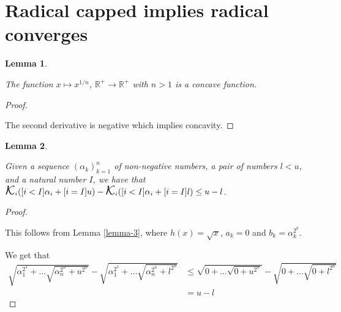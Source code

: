 \documentclass[
]{article}
\DeclareMathOperator*{\kap}{\text{\Large{$\mathcal K$}}}
\theoremstyle{theorem}
\theoremstyle{lemma}
\newtheorem{lemma}{Lemma}
\theoremstyle{corollary}
\theoremstyle{remark}
\theoremstyle{definition}
\begin{document}
\hypertarget{radical-capped-implies-radical-converges}{%
\section{Radical capped implies radical converges}\label{radical-capped-implies-radical-converges}}

\begin{lemma}
\hypertarget{lemma-4}{%
\label{lemma-4}}


The function \(x \mapsto x^{1/n}\), \(\mathbb R^+ \to \mathbb R^+\) with \(n > 1\) is a concave function.

\end{lemma}
\begin{proof}

\hypertarget{proof-4}{%
\label{proof-4}}
The second derivative is negative which implies concavity.

\end{proof}
\begin{lemma}
\hypertarget{lemma-5}{%
\label{lemma-5}}


Given a sequence \((\alpha_k)_{k=1}^n\) of non-negative numbers, a pair of numbers \(l < u\), and a natural number \(I\), we have that \(\kap_i([i < I]\alpha_i + [i = I]u) - \kap_i([i < I]\alpha_i + [i = I]l) \leq u - l\).

\end{lemma}
\begin{proof}

\hypertarget{proof-5}{%
\label{proof-5}}
This follows from Lemma \ref{lemma-3}, where \(h(x) = \sqrt{x}\), \(a_k = 0\) and \(b_k=\alpha_k^{2^k}\).

We get that \[\begin{aligned}
\sqrt{\alpha_1^{2^1} + \dots \sqrt{\alpha_n^{2^n} + u^{2^n}}} - \sqrt{\alpha_1^{2^1} + \dots \sqrt{\alpha_n^{2^n} + l^{2^n}}} &\leq \sqrt{0 + \dots \sqrt{0 + u^{2^n}}} - \sqrt{0 + \dots \sqrt{0 + l^{2^n}}}\\
&=u - l
\end{aligned}\]

\end{proof}
\end{document}
